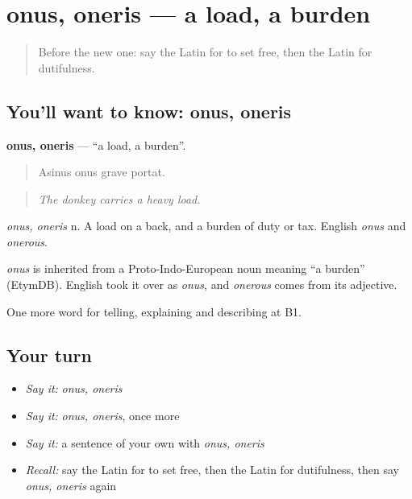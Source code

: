 \section[onus, oneris]{onus, oneris — a load, a burden}

\label{lesson:LA-C389-onus}



\begin{quote}
Before the new one: say the Latin for to set free, then the Latin for dutifulness.
\end{quote}

\subsection*{You'll want to know: onus, oneris}
\textbf{onus, oneris} — \textquotedblleft{}a load, a burden\textquotedblright{}.

\begin{quote}
Asinus onus grave portat.
\end{quote}

\begin{quote}
\emph{The donkey carries a heavy load.}
\end{quote}

\emph{onus, oneris} n. A load on a back, and a burden of duty or tax. English \emph{onus} and \emph{onerous}.

\begin{cousinweb}
\emph{onus} is inherited from a Proto-Indo-European noun meaning \textquotedblleft{}a burden\textquotedblright{} (EtymDB). English took it over as \emph{onus}, and \emph{onerous} comes from its adjective.
\end{cousinweb}

\begin{grammarlens}[title={What you've built}]
One more word for telling, explaining and describing at B1.
\end{grammarlens}

\subsection*{Your turn}
\begin{itemize}
\raggedright
  \item \emph{Say it:} \emph{onus, oneris}
  \item \emph{Say it:} \emph{onus, oneris}, once more
  \item \emph{Say it:} a sentence of your own with \emph{onus, oneris}
  \item \emph{Recall:} say the Latin for to set free, then the Latin for dutifulness, then say \emph{onus, oneris} again
\end{itemize}

